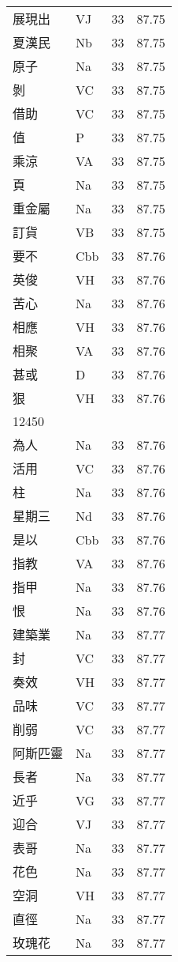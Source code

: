 \documentclass[twocolumn]{book}
\begin{document}
\begin{supertabular}{llrr}
展現出 & VJ & 33 &  87.75\\
夏漢民 & Nb & 33 &  87.75\\
原子 & Na & 33 &  87.75\\
剝 & VC & 33 &  87.75\\
借助 & VC & 33 &  87.75\\
值 & P & 33 &  87.75\\
乘涼 & VA & 33 &  87.75\\
頁 & Na & 33 &  87.75\\
重金屬 & Na & 33 &  87.75\\
訂貨 & VB & 33 &  87.75\\
要不 & Cbb & 33 &  87.76\\
英俊 & VH & 33 &  87.76\\
苦心 & Na & 33 &  87.76\\
相應 & VH & 33 &  87.76\\
相聚 & VA & 33 &  87.76\\
甚或 & D & 33 &  87.76\\
狠 & VH & 33 &  87.76\\
12450\\
為人 & Na & 33 &  87.76\\
活用 & VC & 33 &  87.76\\
柱 & Na & 33 &  87.76\\
星期三 & Nd & 33 &  87.76\\
是以 & Cbb & 33 &  87.76\\
指教 & VA & 33 &  87.76\\
指甲 & Na & 33 &  87.76\\
恨 & Na & 33 &  87.76\\
建築業 & Na & 33 &  87.77\\
封 & VC & 33 &  87.77\\
奏效 & VH & 33 &  87.77\\
品味 & VC & 33 &  87.77\\
削弱 & VC & 33 &  87.77\\
阿斯匹靈 & Na & 33 &  87.77\\
長者 & Na & 33 &  87.77\\
近乎 & VG & 33 &  87.77\\
迎合 & VJ & 33 &  87.77\\
表哥 & Na & 33 &  87.77\\
花色 & Na & 33 &  87.77\\
空洞 & VH & 33 &  87.77\\
直徑 & Na & 33 &  87.77\\
玫瑰花 & Na & 33 &  87.77\\

\end{supertabular}
\end{document}
